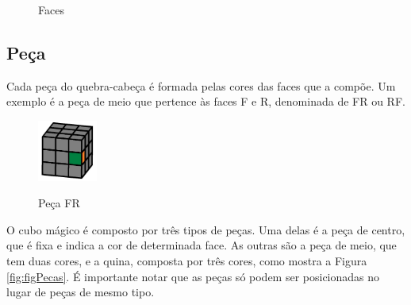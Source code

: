 \begin{figure}[!htb]
    \centering
    \quad %
    \quad %
\caption{Faces}
\label{fig:figFaces}
\end{figure}

\subsection{Peça} 
Cada peça do quebra-cabeça é formada pelas cores das faces que a compõe. Um exemplo é a peça de meio que pertence às faces F e R, denominada de FR ou RF.

\begin{figure}[!htb]
    \centering
    {
        \includegraphics[height=2cm]{imagens/pecaRF.jpg}
        \label{figFront}
    }
    
\caption{Peça FR}
\label{fig:figPeca}
\end{figure}

O cubo mágico é composto por três tipos de peças. Uma delas é a peça de centro, que é fixa e indica a cor de determinada face. As outras são a peça de meio, que tem duas cores, e a quina, composta por três cores, como mostra a Figura \ref{fig:figPecas}. É importante notar que as peças só podem ser posicionadas no lugar de peças de mesmo tipo.


